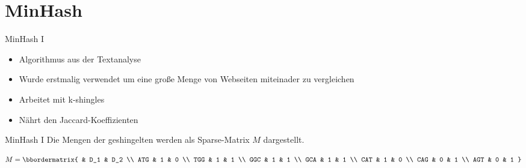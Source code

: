 \section{MinHash}

\begin{frame}{MinHash I \cite{minhash}}
    \begin{itemize}
        \item Algorithmus aus der Textanalyse
        \item Wurde erstmalig verwendet um eine große Menge von Webseiten miteinader zu vergleichen
        \item Arbeitet mit k-shingles
        \item Nährt den Jaccard-Koeffizienten
    \end{itemize}
\end{frame}

\begin{frame}{MinHash I \cite{minhash}}
    Die Mengen der geshingelten werden als Sparse-Matrix $ M $ dargestellt.
    
    \begin{example}
        \begin{equation*}
            M = 
            \bbordermatrix{
                & D_1 & D_2 \\
                ATG & 1 & 0 \\
                TGG & 1 & 1 \\
                GGC & 1 & 1 \\
                GCA & 1 & 1 \\
                CAT & 1 & 0 \\
                CAG & 0 & 1 \\
                AGT & 0 & 1
            }
        \end{equation*}
    \end{example}
\end{frame}